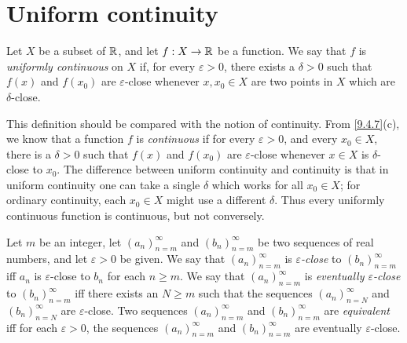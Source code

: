 \section{Uniform continuity}\label{sec:9.9}

\setcounter{thm}{1}
\begin{defn}\label{9.9.2}
  Let \(X\) be a subset of \(\mathbb{R}\), and let \(f : X \to \mathbb{R}\) be a function.
  We say that \(f\) is \emph{uniformly continuous} on \(X\) if, for every \(\varepsilon > 0\), there exists a \(\delta > 0\) such that \(f(x)\) and \(f(x_0)\) are \(\varepsilon\)-close whenever \(x, x_0 \in X\) are two points in \(X\) which are \(\delta\)-close.
\end{defn}

\begin{rmk}\label{9.9.3}
  This definition should be compared with the notion of continuity.
  From \cref{9.4.7}(c), we know that a function \(f\) is \emph{continuous} if for every \(\varepsilon > 0\), and every \(x_0 \in X\), there is a \(\delta > 0\) such that \(f(x)\) and \(f(x_0)\) are \(\varepsilon\)-close whenever \(x \in X\) is \(\delta\)-close to \(x_0\).
  The difference between uniform continuity and continuity is that in uniform continuity one can take a single \(\delta\) which works for all \(x_0 \in X\);
  for ordinary continuity, each \(x_0 \in X\) might use a different \(\delta\).
  Thus every uniformly continuous function is continuous, but not conversely.
\end{rmk}

\setcounter{thm}{4}
\begin{defn}\label{9.9.5}
  Let \(m\) be an integer, let \((a_n)_{n = m}^\infty\) and \((b_n)_{n = m}^\infty\) be two sequences of real numbers, and let \(\varepsilon > 0\) be given.
  We say that \((a_n)_{n = m}^\infty\) is \emph{\(\varepsilon\)-close} to \((b_n)_{n = m}^\infty\) iff \(a_n\) is \(\varepsilon\)-close to \(b_n\) for each \(n \geq m\).
  We say that \((a_n)_{n = m}^\infty\) is \emph{eventually \(\varepsilon\)-close} to \((b_n)_{n = m}^\infty\) iff there exists an \(N \geq m\) such that the sequences \((a_n)_{n = N}^\infty\) and \((b_n)_{n = N}^\infty\) are \(\varepsilon\)-close.
  Two sequences \((a_n)_{n = m}^\infty\) and \((b_n)_{n = m}^\infty\) are \emph{equivalent} iff for each \(\varepsilon > 0\), the sequences \((a_n)_{n = m}^\infty\) and \((b_n)_{n = m}^\infty\) are eventually \(\varepsilon\)-close.
\end{defn}

